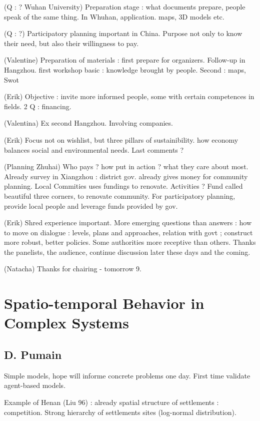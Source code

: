 (Q : ? Wuhan University) Preparation stage : what documents prepare, people speak of the same thing. In Whuhan, application. maps, 3D models etc.

(Q : ?) Participatory planning important in China. Purpose not only to know their need, but also their willingness to pay.

(Valentine) Preparation of materials : first prepare for organizers. Follow-up in Hangzhou. first workshop basic : knowledge brought by people. Second : maps, Swot

(Erik) Objective : invite more informed people, some with certain competences in fields. 2 Q : financing.

(Valentina) Ex second Hangzhou. Involving companies. 

(Erik) Focus not on wishlist, but three pillars of sustainibility. how economy balances social and environmental needs. Last comments ?

(Planning Zhuhai) Who pays ? how put in action ? what they care about most. Already survey in Xiangzhou : district gov. already gives money for community planning. Local Commities uses fundings to renovate. Activities ? Fund called beautiful three corners, to renovate community. For participatory planning, provide local people and leverage funds provided by gov.

(Erik) Shred experience important. More emerging questions than answers : how to move on dialogue : levels, plans and approaches, relation with govt ; construct more robust, better policies. Some authorities more receptive than others.
Thanks the panelists, the audience, continue discussion later these days and the coming.


(Natacha) Thanks for chairing - tomorrow 9.





\section*{Spatio-temporal Behavior in Complex Systems}

\subsection*{D. Pumain}

Simple models, hope will informe concrete problems one day. First time validate agent-based models.

Example of Henan (Liu 96) : already spatial structure of settlements : competition. Strong hierarchy of settlements sites (log-normal distribution).

